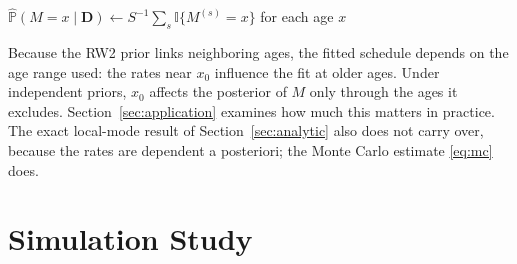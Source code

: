 \documentclass[12pt, letterpaper]{article}
\begin{document}
\begin{algorithm}[htb!]
\caption{Posterior distribution of the modal age at death}
\label{alg:estimation}
\small{
  \SetAlgoLined
  $\widehat{\mathbb{P}}(M = x \mid \bm{D}) \leftarrow S^{-1} \sum_{s} \mathbb{I}\{M^{(s)} = x\}$ for each age $x$ \;
}
\end{algorithm}

Because the RW2 prior links neighboring ages, the fitted schedule depends on the age range used: the rates near $x_0$ influence the fit at older ages. Under independent priors, $x_0$ affects the posterior of $M$ only through the ages it excludes. Section~\ref{sec:application} examines how much this matters in practice. The exact local-mode result of Section~\ref{sec:analytic} also does not carry over, because the rates are dependent a posteriori; the Monte Carlo estimate \eqref{eq:mc} does.

\section{Simulation Study}
\label{sec:simulation}
\end{document}
